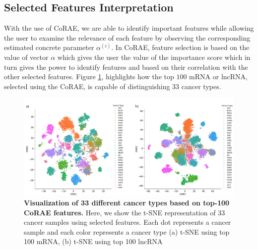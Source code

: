 \documentclass{bioinfo}
\begin{document}
\subsection{Selected Features Interpretation} \label{inter}
With the use of CoRAE, we are able to identify important features while allowing the user to examine the relevance of each feature by observing the corresponding estimated concrete parameter $\alpha^{(i)}$.
In CoRAE, feature selection is based on the value of vector $\alpha$ which gives the user the value of the importance score which in turn gives the power to identify features and based on their correlation with the other selected features. 
Figure \ref{fig:tsne}, highlights how the top $100$ mRNA or lncRNA, selected using the CoRAE, is capable of distinguishing $33$ cancer types. 
\begin{figure}[hbt]
  \centering
  \includegraphics[scale=0.45]{fig/tSNE.pdf}
    \caption{\textbf{Visualization of 33 different cancer types based on top-100 CoRAE features.} Here, we show the t-SNE representation of 33 cancer samples using selected features. Each dot represents a cancer sample and each color represents a cancer type (a) t-SNE using top 100 mRNA, (b) t-SNE using top 100 lncRNA}
    \label{fig:tsne}
\end{figure}
\end{document}

